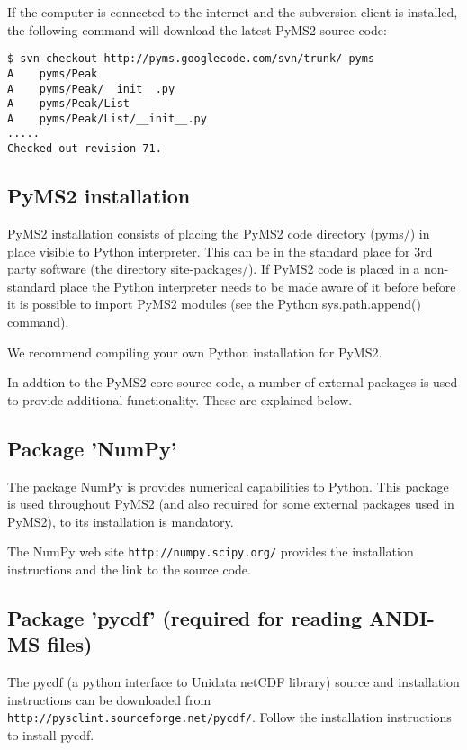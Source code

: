 If the computer is connected to the internet and the subversion client
is installed, the following command will download the latest PyMS2 source
code:

\begin{verbatim}
$ svn checkout http://pyms.googlecode.com/svn/trunk/ pyms
A    pyms/Peak
A    pyms/Peak/__init__.py
A    pyms/Peak/List
A    pyms/Peak/List/__init__.py
.....
Checked out revision 71.
\end{verbatim}

\subsection{PyMS2 installation}

PyMS2 installation consists of placing the PyMS2 code directory (pyms/) in
place visible to Python interpreter.  This can be in the standard place
for 3rd party software (the directory site-packages/). If PyMS2 code is
placed in a non-standard place the Python interpreter needs to be made
aware of it before before it is possible to import PyMS2 modules (see the
Python sys.path.append() command).

We recommend compiling your own Python installation for PyMS2.

In addtion to the PyMS2 core source code, a number of external packages
is used to provide additional functionality. These are explained below.

\subsection{\label{subsec:numpy}Package 'NumPy'}

The package NumPy is provides numerical capabilities to Python. This
package is used throughout PyMS2 (and also required for some external
packages used in PyMS2), to its installation is mandatory. 

The NumPy web site {\tt http://numpy.scipy.org/} provides the installation
instructions and the link to the source code.

\subsection{\label{subsec:pycdf}Package 'pycdf' (required for reading
ANDI-MS files)}

The pycdf (a python interface to Unidata netCDF library) source and
installation instructions can be downloaded from
{\tt http://pysclint.sourceforge.net/pycdf/}. Follow the installation
instructions to install pycdf. 

